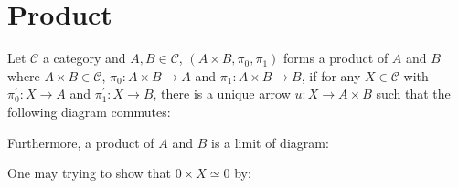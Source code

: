 \documentclass[./main.tex]{subfiles}
\begin{document}
\section{Product}

\begin{definition}[Product]
  Let $\mathcal{C}$ a category and $A, B \in \mathcal{C}$,
  $(A \times B, \pi_0, \pi_1)$ forms a product of $A$ and $B$
  where $A \times B \in \mathcal{C}$, $\pi_0 : A \times B \rightarrow A$ 
  and $\pi_1 : A \times B \rightarrow B$,
  if for any $X \in \mathcal{C}$ with $\pi^\prime_0 : X \rightarrow A$ and
  $\pi^\prime_1 : X \rightarrow B$,
  there is a unique arrow $u : X \rightarrow A \times B$ such that the following
  diagram commutes:

  \begin{center}
  \end{center}

  Furthermore, a product of $A$ and $B$ is a limit of diagram:
  \begin{center}
  \end{center}
\end{definition}

One may trying to show that $0 \times X \simeq 0$ by:

\begin{center}
\end{center}
\end{document}
